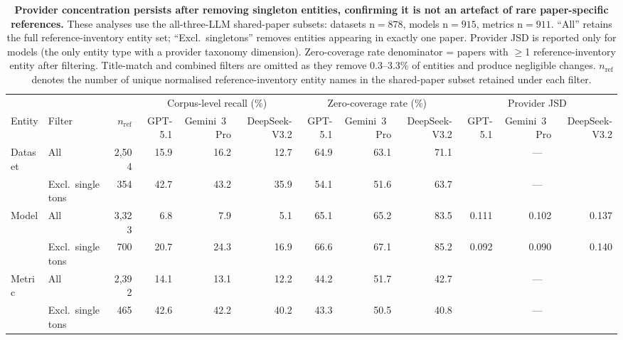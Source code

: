 \begin{table}[H]
\centering
\caption{\textbf{Provider concentration persists after removing singleton entities, confirming it is not an artefact of rare paper-specific references.} These analyses use the all-three-LLM shared-paper subsets: datasets n$=878$, models n$=915$, metrics n$=911$. ``All'' retains the full reference-inventory entity set; ``Excl.\ singletons'' removes entities appearing in exactly one paper. Provider JSD is reported only for models (the only entity type with a provider taxonomy dimension). Zero-coverage rate denominator = papers with $\geq$1 reference-inventory entity after filtering. Title-match and combined filters are omitted as they remove 0.3--3.3\% of entities and produce negligible changes. $n_\text{ref}$ denotes the number of unique normalised reference-inventory entity names in the shared-paper subset retained under each filter.}
\label{tab:established_robustness}
\begin{adjustbox}{max width=\textwidth}
\begin{tabular}{ll r rrr rrr rrr}
\toprule
& & & \multicolumn{3}{c}{Corpus-level recall (\%)} & \multicolumn{3}{c}{Zero-coverage rate (\%)} & \multicolumn{3}{c}{Provider JSD} \\
\cmidrule(lr){4-6} \cmidrule(lr){7-9} \cmidrule(lr){10-12}
Entity & Filter & $n_\text{ref}$ & GPT-5.1 & Gemini~3~Pro & DeepSeek-V3.2 & GPT-5.1 & Gemini~3~Pro & DeepSeek-V3.2 & GPT-5.1 & Gemini~3~Pro & DeepSeek-V3.2 \\
\midrule
Dataset  & All & 2{,}504 & 15.9 & 16.2 & 12.7 & 64.9 & 63.1 & 71.1 & \multicolumn{3}{c}{---} \\
         & Excl.\ singletons & 354 & 42.7 & 43.2 & 35.9 & 54.1 & 51.6 & 63.7 & \multicolumn{3}{c}{---} \\
\addlinespace
Model    & All & 3{,}323 & 6.8 & 7.9 & 5.1 & 65.1 & 65.2 & 83.5 & 0.111 & 0.102 & 0.137 \\
         & Excl.\ singletons & 700 & 20.7 & 24.3 & 16.9 & 66.6 & 67.1 & 85.2 & 0.092 & 0.090 & 0.140 \\
\addlinespace
Metric   & All & 2{,}392 & 14.1 & 13.1 & 12.2 & 44.2 & 51.7 & 42.7 & \multicolumn{3}{c}{---} \\
         & Excl.\ singletons & 465 & 42.6 & 42.2 & 40.2 & 43.3 & 50.5 & 40.8 & \multicolumn{3}{c}{---} \\
\bottomrule
\end{tabular}
\end{adjustbox}
\end{table}

